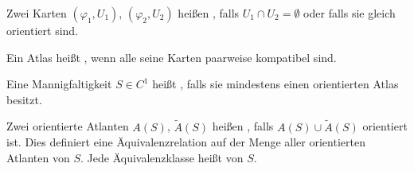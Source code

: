 \begin{theorem} \label{thm:9.9}
  \begin{enum-arab}
    \item Zwei Karten $(\varphi_1,U_1)$, $(\varphi_2,U_2)$ heißen  , falls $U_1 \cap U_2 = \emptyset$ oder falls sie gleich orientiert sind.
    
    \item Ein Atlas heißt  , wenn alle seine Karten paarweise kompatibel sind.
    
    \item Eine Mannigfaltigkeit $S \in C^1$ heißt  , falls sie mindestens einen orientierten Atlas besitzt.
    
    \item Zwei orientierte Atlanten $A(S)$, $\widetilde{A}(S)$ heißen  , falls $A(S) \cup \widetilde{A}(S)$ orientiert ist. Dies definiert eine Äquivalenzrelation auf der Menge aller orientierten Atlanten von $S$. Jede Äquivalenzklasse heißt   von $S$.
  \end{enum-arab}
\end{theorem}

